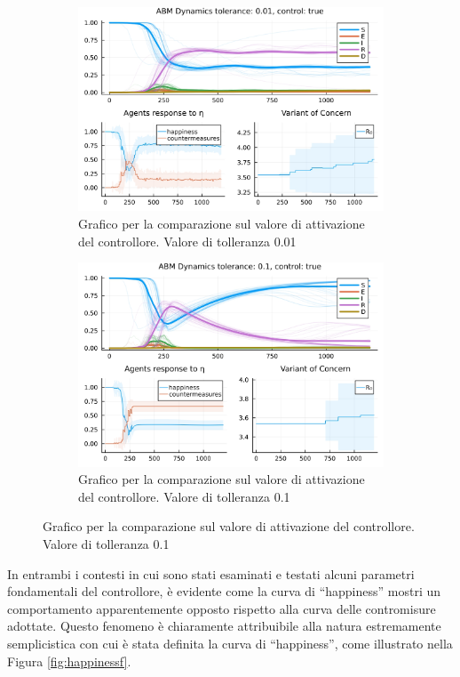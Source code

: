 \begin{figure}[H]
\begin{subfigure}[b]{0.45\textwidth}
		\includegraphics[width=\textwidth]{img/SocialNetworkABM_3_TOL.jpg}
		\caption{Grafico per la comparazione sul valore di attivazione del controllore. Valore di tolleranza 0.01}
		\label{fig:comparison_tol_1e-2}
	\end{subfigure}
	\hfill
	\begin{subfigure}[b]{0.45\textwidth}
		\centering
		\includegraphics[width=\textwidth]{img/SocialNetworkABM_4_TOL.jpg}
		\caption{Grafico per la comparazione sul valore di attivazione del controllore. Valore di tolleranza 0.1}
		\label{fig:comparison_tol_1e-1}
	\end{subfigure}
\end{figure}

In entrambi i contesti in cui sono stati esaminati e testati alcuni 
parametri fondamentali del controllore, è evidente come la curva di 
``happiness'' mostri un comportamento apparentemente opposto rispetto alla 
curva delle contromisure adottate. Questo fenomeno è chiaramente 
attribuibile alla natura estremamente semplicistica con cui è stata 
definita la curva di ``happiness'', come illustrato nella Figura 
\ref{fig:happinessf}.

